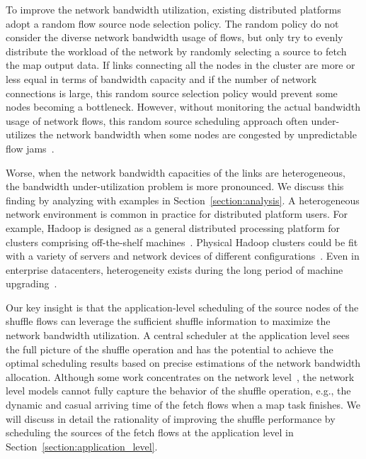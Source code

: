 \documentclass[10pt,journal,compsoc]{IEEEtran}
\begin{document}
To improve the network bandwidth utilization, existing distributed platforms~\cite{zaharia2012resilient,vavilapalli2013apache} adopt a random flow source node selection policy. 
The random policy do not consider the diverse network bandwidth usage of flows, but
only try to evenly distribute the workload of the network
by randomly selecting a source to fetch the map output data.
If links connecting all the nodes in the cluster
are more or less equal in terms of bandwidth capacity
and if the number of network connections is
large, this random source selection policy would prevent some nodes becoming a bottleneck.
However, 
without monitoring the actual bandwidth usage of network flows,
this random source scheduling approach often under-utilizes the network bandwidth 
when some nodes are congested by unpredictable flow jams~\cite{chowdhury2011managing}. 

Worse, when the network bandwidth capacities of the links are heterogeneous, 
the bandwidth under-utilization problem is more pronounced. 
We discuss this finding by analyzing with examples 
in Section~\ref{section:analysis}.
A heterogeneous network environment is common in practice
for distributed platform users. 
For example, Hadoop is designed as a general distributed processing platform for 
clusters comprising off-the-shelf machines~\cite{dean2008mapreduce}. 
Physical Hadoop clusters could be fit with a variety of servers and network devices of different configurations~\cite{zaharia2008improving}. 
Even in enterprise datacenters, heterogeneity exists during the long period of machine upgrading~\cite{kant2009data}.

Our key insight is that the application-level scheduling of the source nodes of the shuffle flows can leverage the sufficient shuffle information to maximize the network bandwidth utilization. 
A central scheduler at the application level sees the full picture of the shuffle operation and has the potential to achieve the optimal scheduling results based on precise estimations of the network bandwidth allocation.
Although some work concentrates on the network level~\cite{shieh2011sharing,chowdhury2011managing,chowdhury2014efficient,chowdhury2015efficient}, 
the network level models cannot fully capture the behavior of the shuffle operation, e.g., the dynamic and casual arriving time of the fetch flows
when a map task finishes. 
We will discuss in detail the rationality of improving the shuffle performance by scheduling the sources of the fetch flows at the application level in Section~\ref{section:application_level}.
\end{document}
